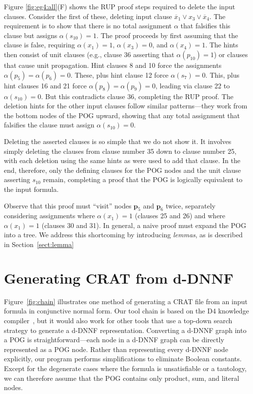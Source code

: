 \documentclass[letterpaper,USenglish,cleveref, autoref, thm-restate]{lipics-v2021}
\newcommand{\obar}[1]{\overline{#1}}
\newcommand{\assign}{\alpha}
\newcommand{\makenode}[1]{\mathbf{#1}}
\newcommand{\nodep}{\makenode{p}}
\newcommand{\progname}[1]{\textsc{#1}}
\newcommand{\dfour}{\progname{D4}}
\begin{document}
Figure \ref{fig:eg4:all}(F) shows the RUP proof steps required to
delete the input clauses.  Consider the first of these, deleting
input clause $\obar{x}_1 \lor x_3 \lor \obar{x}_4$.  The requirement is to show
that there is no total assignment $\assign$ that falsifies this clause but assigns $\assign(s_{10}) = 1$.
The proof proceeds by first assuming that the clause is false, requiring
$\assign(x_1) = 1$, $\assign(x_3) = 0$, and $\assign(x_4) = 1$.  The hints then consist of unit
clauses (e.g., clause 36 asserting that $\alpha(p_{10}) = 1$) or
clauses that cause unit propagation.  Hint clauses 8 and 10 force the
assignments $\assign(p_5) = \assign(p_6) = 0$.  These, plus hint clause 12 force
$\assign(s_7) = 0$.  This, plus hint clauses 16 and 21 force $\assign(p_8) = \assign(p_9) = 0$, leading
via clause 22 to $\assign(s_{10}) = 0$.  But this contradicts clause 36,
completing the RUP proof.  The deletion hints for the other input
clauses follow similar patterns---they work from the bottom nodes of
the POG upward, showing that any total assignment that falsifies the clause
must assign $\assign(s_{10}) = 0$.

Deleting the asserted clauses is so simple that we do not show it.  It
involves simply deleting the clauses from clause number 35 down to
clause number 25, with each deletion using the same hints as were used
to add that clause.  In the end, therefore, only the defining clauses
for the POG nodes and the unit clause asserting $s_{10}$ remain,
completing a proof that the POG is logically equivalent to the input
formula.

Observe that this proof must ``visit'' nodes
$\nodep_5$ and $\nodep_6$ twice, separately considering  assignments where $\assign(x_1) = 1$
(clauses 25 and 26) and where $\assign(x_1) = 1$ (clauses 30 and 31).  In
general, a naive proof must expand the POG into a tree.
We address this shortcoming by introducing {\em lemmas}, as is described in Section~\ref{sect:lemma}


\section{Generating CRAT from d-DNNF}
\label{section:generating:crat}

Figure~\ref{fig:chain} illustrates one method of generating a CRAT
file from an input formula in conjunctive normal form.  Our tool chain
is based on the \dfour{} knowledge compiler~\cite{lagniez:ijcai:2017},
but it would also work for other tools that use a top-down search
strategy to generate a d-DNNF representation.  Converting a d-DNNF
graph into a POG is straightforward---each node in a d-DNNF graph can
be directly represented as a POG node.  Rather than representing every d-DNNF node explicitly,
our program performs simplifications
to eliminate Boolean constants.  Except for the degenerate cases where the formula is unsatisfiable or a tautology, we can
therefore assume that the POG contains only product, sum,
and literal nodes.
\end{document}
